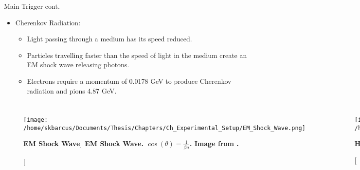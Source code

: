\documentclass[10pt]{beamer}
\begin{document}
\begin{frame}[fragile]{Main Trigger cont.}

	\begin{itemize}
		\item \alert{Cherenkov Radiation}:
			\begin{itemize}
				\item[--] Light passing through a medium has its speed reduced.
				\item[--] Particles travelling faster than the speed of light in the medium create an EM shock wave releasing photons.
				\item[--] \alert{Electrons require a momentum of 0.0178 GeV} to produce Cherenkov radiation and \alert{pions 4.87 GeV}.
			\end{itemize}
	\end{itemize}
	
	\begin{columns}[T,onlytextwidth]  
	\begin{figure}[!ht]
	\begin{center}
	\texttt{[image: /home/skbarcus/Documents/Thesis/Chapters/Ch\_Experimental\_Setup/EM\_Shock\_Wave.png]}
	\end{center}
	\caption[\bf{EM Shock Wave}]{
	{\bf{EM Shock Wave.}} $\cos(\theta) = \frac{1}{\beta n}$. Image from \cite{Thesis:Cummings}.}
	\label{fig:halla_top}
	\end{figure}	
	
	\begin{figure}[!ht]
	\begin{center}
	\texttt{[image: /home/skbarcus/Documents/Thesis/Chapters/Ch\_Experimental\_Setup/GC.png]}
	\end{center}
	\caption[\bf{Hall A GC Interior}]{
	{\bf{Hall A GC Interior.}} Image from \cite{Thesis:Ye}.}
	\label{fig:halla_top}
	\end{figure}	
	
	\end{columns}
	
\end{frame}
\end{document}
